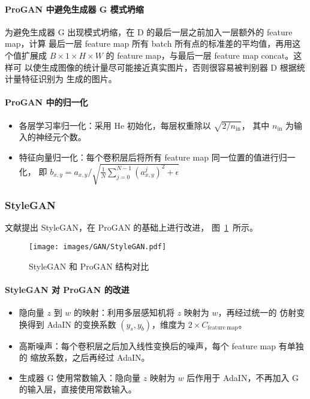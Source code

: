 \paragraph{ProGAN 中避免生成器 G 模式坍缩}
为避免生成器 G 出现模式坍缩，在 D 的最后一层之前加入一层额外的 feature map，计算
最后一层 feature map 所有 batch 所有点的标准差的平均值，再用这个值扩展成 $B
\times 1 \times H \times W$ 的 feature map，与最后一层 feature map concat。这样可
以使生成图像的统计量尽可能接近真实图片，否则很容易被判别器 D 根据统计量特征识别为
生成的图片。

\paragraph{ProGAN 中的归一化}
\begin{itemize}
  \item 各层学习率归一化：采用 He 初始化，每层权重除以 $\sqrt{2/n_{\mathrm{in}}}$，
    其中 $n_{\mathrm{in}}$ 为输入的神经元个数。
  \item 特征向量归一化：每个卷积层后将所有 feature map 同一位置的值进行归一化，
    即 $b_{x, y} = a_{x, y}/\sqrt{\frac{1}{N} \sum_{j=0}^{N-1} \left( a_{x,
          y}^{j} \right) ^ 2 + \epsilon }$
\end{itemize}

\subsubsection{StyleGAN}
文献提出 StyleGAN，在 ProGAN 的基础上进行改进，
图~\ref{fig:stylegan}~所示。

\begin{figure}[ht]
  \centering
  \texttt{[image: images/GAN/StyleGAN.pdf]}
  \caption{StyleGAN 和 ProGAN 结构对比}
  \label{fig:stylegan}
\end{figure}

\paragraph{StyleGAN 对 ProGAN 的改进}
\begin{itemize}
  \item 隐向量 $z$ 到 $w$ 的映射：利用多层感知机将 $z$ 映射为 $w$，再经过统一的
    仿射变换得到 AdaIN 的变换系数 $(y_s, y_b)$，维度为 $2 \times
    C_{\mathrm{feature\ map}}$。
  \item 高斯噪声：每个卷积层之后加入线性变换后的噪声，每个 feature map 有单独的
    缩放系数，之后再经过 AdaIN。
  \item 生成器 G 使用常数输入：隐向量 $z$ 映射为 $w$ 后作用于 AdaIN，不再加入 G
    的输入层，直接使用常数输入。
\end{itemize}

